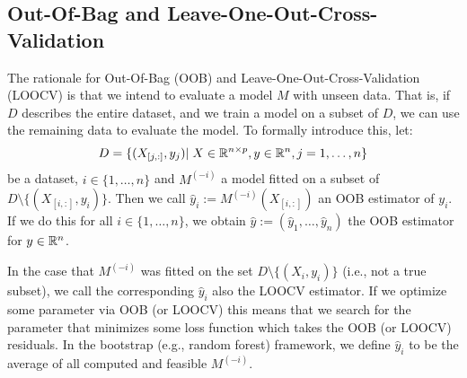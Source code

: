 {	\subsection{Out-Of-Bag and Leave-One-Out-Cross-Validation}{ \label{sec:OOB_LOOCV}
		The rationale for Out-Of-Bag ({OOB}) and Leave-One-Out-Cross-Validation ({LOOCV}) is that we intend to evaluate a model $M$ with unseen data. That is, if $D$ describes the entire dataset, and we train a model on a subset of $D$, we can use the remaining data to evaluate the model. 
		To formally introduce this, let:
		$$
			D=\{(X_{[j,:]},y_j)|\; X\in\mathbb{R}^{n\times p}, y\in \mathbb{R}^n, j=1,\dots,n\}
		$$
		be a dataset, $i\in \{1,\dots,n\}$ and $M^{(-i)}$ a model fitted on a subset of $D\setminus\{(X_{[i,:]},y_i)\}$. Then we call $\hat y_i:= M^{(-i)}(X_{[i,:]})$ an {OOB} estimator of $y_i$. If we do this for all $i\in\{1,\dots,n\}$, we obtain $\hat y := \left(\hat y_1,\dots,\hat y_n\right)$ the OOB estimator for $y\in \mathbb{R}^n$.
		
		In the case that $M^{(-i)}$ was fitted on the set $D\setminus\{(X_i,y_i)\}$ (i.e., not a true subset), we call the corresponding $\hat y_i$ also the LOOCV estimator.	
		If we optimize some parameter via OOB (or LOOCV) this means that we search for the parameter that minimizes some loss function which takes the OOB (or LOOCV) residuals. 
		In the bootstrap (e.g., random forest) framework, we define $\hat y_i$ to be the average of all computed and feasible $M^{(-i)}$. 
	}

}
